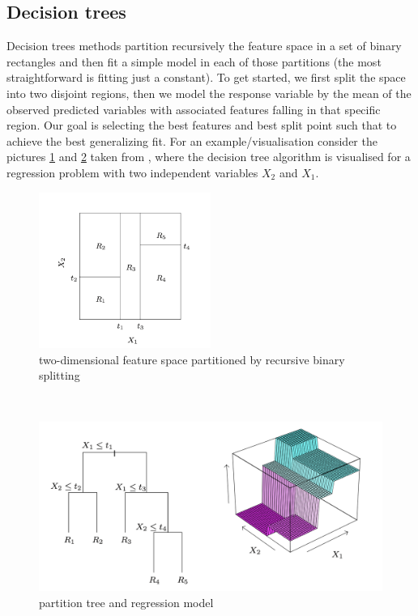 \subsection{Decision trees}
Decision trees methods partition recursively the feature space in a set of binary rectangles and then fit a simple model in each of those partitions (the most straightforward is fitting just a constant).
To get started, we first split the space into two disjoint regions, then we model the response variable by the mean of the observed predicted variables with associated features falling in that specific region. Our goal is selecting the best features and best split point such that to achieve the best generalizing fit.
For an example/visualisation consider the pictures \ref{fig:elements_statistical_learning1} and \ref{fig:elements_statistical_learning2} taken from \cite{hastie2009elements}, where the decision tree algorithm is visualised for a regression problem with two independent variables $X_2$ and $X_1$.
\begin{figure}
    \includegraphics[width=0.5\textwidth]{images/elsii1.png}
    \caption{two-dimensional feature space partitioned by recursive binary splitting}
    \label{fig:elements_statistical_learning1}
  \end{figure}
\\
\begin{figure}
\includegraphics[width=1\textwidth]{images/elsii2.png}
\caption{partition tree and regression model}
\label{fig:elements_statistical_learning2}
\end{figure}
